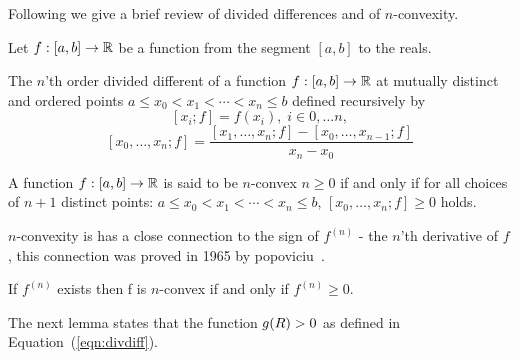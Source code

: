 \documentclass{article}[12pt]
\begin{document}
Following\cite{butt2016generalization} we give a brief review of
divided differences and of $n$-convexity.

Let $f:[a,b] \to \mathbb{R}$ be a function from the segment $[a,b]$ to the
reals.

\begin{definition}
  The $n$'th order divided different of a function $f:[a,b] \to
  \mathbb{R}$ at mutually distinct and ordered points $a \leq x_0 < x_1
  < \cdots < x_n \leq b$
  defined recursively by
  \[ [x_i; f] = f(x_i), \; i \in 0,\ldots n,\]
  \[ [x_0,\ldots,x_n;f] =
    \frac{[x_1,\ldots,x_n;f]-[x_0,\ldots,x_{n-1};f]}{x_n-x_0} \]
\end{definition}

\begin{definition}[$n$-convexity]
 A function $f:[a,b] \to \mathbb{R}$ is said to be $n$-convex  $n \geq 0$
 if and only if for all choices of $n+1$ distinct points: $a \leq x_0 < x_1
  < \cdots < x_n \leq b$, $[x_0,\ldots,x_n;f]\geq 0$ holds.
\end{definition}
$n$-convexity is has a close connection to the sign of $f^{(n)}$ - the $n$'th
derivative of $f$, this connection was proved in 1965 by
popoviciu~\cite{popoviciu1965certaines}.
\begin{theorem} \label{thm:popo}
If $f^{(n)}$ exists then f is $n$-convex if and only if $f^{(n)}\geq 0$.
\end{theorem}

The next lemma states that the function $g(R)>0$ as defined in
Equation~(\ref{eqn:divdiff}).
\end{document}
